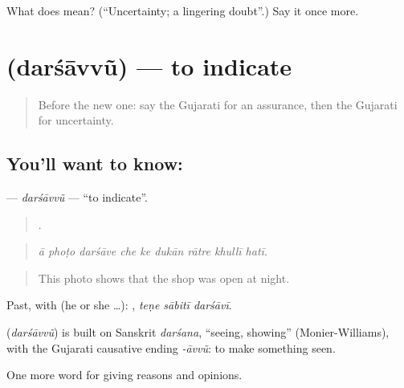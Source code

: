 \begin{tcolorbox}[breakable,colback=teal!4,colframe=teal!35!black,title={Before you move on}]
What does  mean? (\textquotedblleft{}Uncertainty; a lingering doubt\textquotedblright{}.) Say it once more.
\end{tcolorbox}
\section[\texorpdfstring{\gu{દર્શાવવું} (darśāvvũ)}{દર્શાવવું (darśāvvũ)}]{ (darśāvvũ) — to indicate}

\label{lesson:GU-C344-darsavvu}



\begin{quote}
Before the new one: say the Gujarati for an assurance, then the Gujarati for uncertainty.
\end{quote}

\subsection*{You'll want to know: }
\textbf{} — \emph{darśāvvũ} — \textquotedblleft{}to indicate\textquotedblright{}.

\begin{quote}
        .
\end{quote}

\begin{quote}
\emph{ā phoṭo darśāve che ke dukān rātre khullī hatī.}
\end{quote}

\begin{quote}
This photo shows that the shop was open at night.
\end{quote}

Past, with  (he or she …):   , \emph{teṇe sābitī darśāvī}.

\begin{cousinweb}
\textbf{} (\emph{darśāvvũ}) is built on Sanskrit \emph{darśana}, \textquotedblleft{}seeing, showing\textquotedblright{} (Monier-Williams), with the Gujarati causative ending \emph{-āvvũ}: to make something seen.
\end{cousinweb}

\begin{grammarlens}[title={What you've built}]
One more word for giving reasons and opinions.
\end{grammarlens}

